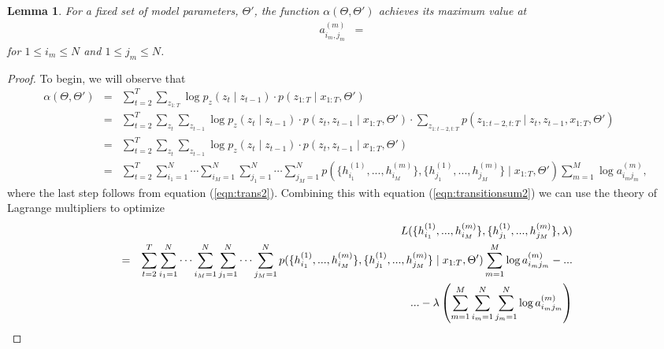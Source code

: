 \documentclass{amsart}
\newtheorem{lemma}[theorem]{Lemma}
\begin{document}
\begin{lemma}
For a fixed set of model parameters, $\Theta'$, the function $\alpha(\Theta,\Theta')$ achieves its maximum value at
\begin{eqnarray*}
a_{i_m,j_m}^{(m)} &=&
\end{eqnarray*}
for $1\leq i_m\leq N$ and $1\leq j_m\leq N$.
\end{lemma}

\begin{proof}
To begin, we will observe that 
\begin{eqnarray*}
\alpha(\Theta,\Theta') &=& \sum_{t=2}^T\sum_{z_{1:T}}\log p_z(z_t\mid z_{t-1})\cdot p(z_{1:T}\mid x_{1:T},\Theta')\\
&=& \sum_{t=2}^T\sum_{z_{t}}\sum_{z_{t-1}}\log p_z(z_t\mid z_{t-1})\cdot p(z_t,z_{t-1}\mid x_{1:T},\Theta')\cdot \sum_{z_{1:t-2,t:T}}p(z_{1:t-2,t:T}\mid z_t,z_{t-1},x_{1:T},\Theta')\\
& = & \sum_{t=2}^T\sum_{z_{t}}\sum_{z_{t-1}}\log p_z(z_t\mid z_{t-1})\cdot p(z_t,z_{t-1}\mid x_{1:T},\Theta')\\
& = & \sum_{t=2}^T\sum_{i_1=1}^N\cdots\sum_{i_M=1}^N\sum_{j_1=1}^N\cdots\sum_{j_M=1}^Np(\{h_{i_1}^{(1)},...,h_{i_M}^{(m)}\},\{h_{j_1}^{(1)},...,h_{j_M}^{(m)}\}\mid x_{1:T},\Theta')\sum_{m=1}^M\log a_{i_mj_m}^{(m)},
\end{eqnarray*}
where the last step follows from equation (\ref{eqn:trans2}).  Combining this with equation (\ref{eqn:transitionsum2}) we can use the theory of Lagrange multipliers to optimize 
\begin{eqnarray*}
&&L(\{h_{i_1}^{(1)},...,h_{i_M}^{(m)}\},\{h_{j_1}^{(1)},...,h_{j_M}^{(m)}\},\lambda) \\
& = & \sum_{t=2}^T\sum_{i_1=1}^N\cdots\sum_{i_M=1}^N\sum_{j_1=1}^N\cdots\sum_{j_M=1}^Np(\{h_{i_1}^{(1)},...,h_{i_M}^{(m)}\},\{h_{j_1}^{(1)},...,h_{j_M}^{(m)}\}\mid x_{1:T},\Theta')\sum_{m=1}^M\log a_{i_mj_m}^{(m)} - ...\\
&&\hspace{10mm}...-\lambda \left(\sum_{m=1}^M\sum_{i_m=1}^N\sum_{j_m=1}^N\log a_{i_mj_m}^{(m)}\right)
\end{eqnarray*}

\end{proof}



\end{document}
